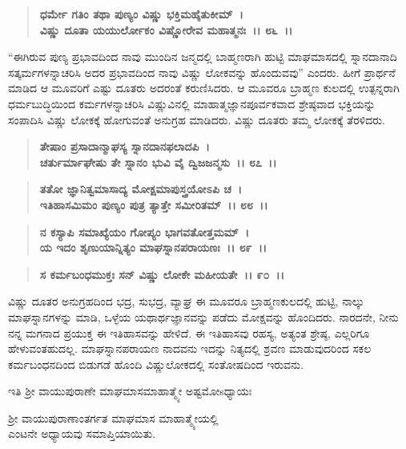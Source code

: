 \begin{verse}
\textbf{ಧರ್ಮೇ ಗತಿಂ ತಥಾ ಪುಣ್ಯಂ ವಿಷ್ಣು ಭಕ್ತಿಮಹೈತುಕೀಮ್~।}\\\textbf{ವಿಷ್ಣು ದೂತಾ ಯಯುರ್ಲೋಕಂ ವಿಷ್ಣೋರೇವ ಮಹಾತ್ಮನಃ~।। ೮೬~।।}
\end{verse}

“ಈಗಿರುವ ಪುಣ್ಯ ಪ್ರಭಾವದಿಂದ ನಾವು ಮುಂದಿನ ಜನ್ಮದಲ್ಲಿ ಬಾಹ್ಮಣರಾಗಿ ಹುಟ್ಟಿ ಮಾಘಮಾಸದಲ್ಲಿ ಸ್ನಾನದಾನಾದಿ ಸತ್ಕರ್ಮಗಳನ್ನಾಚರಿಸಿ ಅದರ ಪ್ರಭಾವದಿಂದ ನಾವು ವಿಷ್ಣು ಲೋಕವನ್ನು ಹೊಂದುವವು” ಎಂದರು. ಹೀಗೆ ಪ್ರಾರ್ಥನೆ ಮಾಡಿದ ಆ ಮೂವರಿಗೆ ಎಷ್ಟು ದೂತರು ಅದರಂತೆ ಕರುಣಿಸಿದರು. ಆ ಮೂವರೂ ಬ್ರಾಹ್ಮಣ ಕುಲದಲ್ಲಿ ಉತ್ಪನ್ನರಾಗಿ ಧರ್ಮಬುದ್ಧಿಯಿಂದ ಕರ್ಮಗಳನ್ನಾಚರಿಸಿ ವಿಷ್ಣುವಿನಲ್ಲಿ ಮಾಹಾತ್ಮಜ್ಞಾನಪೂರ್ವಕವಾದ ಶ್ರೇಷ್ಠವಾದ ಭಕ್ತಿಯನ್ನು ಸಂಪಾದಿಸಿ ವಿಷ್ಣು ಲೋಕಕ್ಕೆ ಹೋಗುವಂತೆ ಅನುಗ್ರಹ ಮಾಡಿದರು. ವಿಷ್ಣು ದೂತರು ತಮ್ಮ ಲೋಕಕ್ಕೆ ತೆರಳಿದರು.

\begin{verse}
\textbf{ತೇಷಾಂ ಪ್ರಸಾದಾನ್ಮಾಘಸ್ಯ ಸ್ನಾನದಾನಫಲಾದಪಿ~।}\\\textbf{ಚರ್ತುರ್ಮಾಘೇಷು ತೇ ಸ್ನಾನಂ ಭುವಿ ವೈ ದ್ವಿಜಜನ್ಮಸು~।। ೮೭~।। }
\end{verse}

\begin{verse}
\textbf{ತತೋ ಜ್ಞಾನಿತ್ವಮಾಸಾದ್ಯ ಮೋಕ್ಷಮಾಪುಸ್ತ್ರಯೋಽಪಿ ಚ~।}\\\textbf{ಇತಿಹಾಸಮಿಮಂ ಪುಣ್ಯಂ ಪುತ್ರ ತ್ಯಾತ್ತೇ ಸಮೀರಿತಮ್~।। ೮೮~।। }
\end{verse}

\begin{verse}
\textbf{ನ ಕಸ್ಯಾಪಿ ಸಮಾಖ್ಯೆಯಂ ಗೋಪ್ಯಂ ಭಾಗವತೋತ್ತಮಮ್~।}\\\textbf{ಯ ಇದಂ ಶೃಣುಯಾನ್ನಿತ್ಯಂ ಮಾಘಸ್ನಾನಪರಾಯಣಃ~।। ೮೯~।। }
\end{verse}

\begin{verse}
\textbf{ಸ ಕರ್ಮಬಂಧಮುಕ್ತಃ ಸನ್ ವಿಷ್ಣು ಲೋಕೇ ಮಹೀಯತೇ~।। ೯೦~।।}
\end{verse}

ವಿಷ್ಣು ದೂತರ ಅನುಗ್ರಹದಿಂದ ಭದ್ರ, ಸುಭದ್ರ, ವ್ಯಾಘ್ರ ಈ ಮೂವರೂ ಬ್ರಾಹ್ಮಣಕುಲದಲ್ಲಿ ಹುಟ್ಟಿ, ನಾಲ್ಕು ಮಾಘಸ್ನಾನಗಳನ್ನು ಮಾಡಿ, ಒಳ್ಳೆಯ ಯಥಾರ್ಥಜ್ಞಾನವನ್ನು ಪಡೆದು ಮೋಕ್ಷವನ್ನು ಹೊಂದಿದರು. ನಾರದನೇ, ನೀನು ನನ್ನ ಮಗನಾದ ಪ್ರಯುಕ್ತ ಈ ಇತಿಹಾಸವನ್ನು ಹೇಳಿದೆ. ಈ ಇತಿಹಾಸವು ರಹಸ್ಯ, ಅತ್ಯಂತ ಶ್ರೇಷ್ಠ, ಎಲ್ಲರಿಗೂ ಹೇಳುವಂತಹುದಲ್ಲ. ಮಾಘಸ್ನಾನಪರಾಯಣ ನಾದವನು ಇದನ್ನು ನಿತ್ಯದಲ್ಲಿ ಶ್ರವಣ ಮಾಡುವುದರಿಂದ ಸಕಲ ಕರ್ಮಬಂಧನದಿಂದ ಬಿಡುಗಡೆ ಹೊಂದಿ ವಿಷ್ಣುಲೋಕದಲ್ಲಿ ಸಂತೋಷದಿಂದ ಇರುವನು.

\begin{center}
ಇತಿ ಶ‍್ರೀ ವಾಯುಪುರಾಣೇ ಮಾಘಮಾಸಮಾಹಾತ್ಮ್ಯೇ ಅಷ್ಟಮೋsಧ್ಯಾಯಃ
\end{center}

\begin{center}
 ಶ‍್ರೀ ವಾಯುಪುರಾಣಾಂತರ್ಗತ ಮಾಘಮಾಸ ಮಾಹಾತ್ಮ್ಯೇಯಲ್ಲಿ \\ ಎಂಟನೇ ಅಧ್ಯಾಯವು ಸಮಾಪ್ತಿಯಾಯಿತು.
\end{center}

